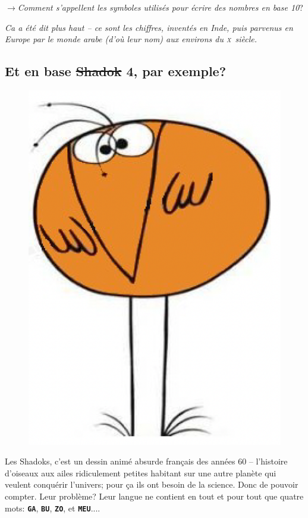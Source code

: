 \documentclass[12pt]{article}
\newcommand{\MaQuestion}[1]{\par\vspace{0.3\baselineskip}\noindent$\rightarrow$\textit{#1}?\par\vspace{0.3\baselineskip}}
\newenvironment{MaReponse}
		{\begin{greyedtextbox}\itshape} %
		{\end{greyedtextbox}}            %
\begin{document}
	 \MaQuestion{Comment s'appellent les symboles utilisés pour écrire des nombres en base 10}
\begin{MaReponse}
	Ca a été dit plus haut -- ce sont les chiffres, inventés en Inde, puis parvenus en Europe par le monde arabe (d'où leur nom) aux environs du \textsc{x}\ieme ~siècle.
\end{MaReponse}
	 
	 \pagebreak
	 \subsection{Et en base \sout{Shadok} 4, par exemple?}
	 
	\begin{figure}
		\includegraphics[scale=0.2]{001_Shadok.png}
	\end{figure}
	 Les Shadoks, c'est un dessin animé absurde français des années 60 -- l'histoire d'oiseaux aux ailes ridiculement petites habitant sur une autre planète qui veulent conquérir l'univers; pour ça ils ont besoin de la science. Donc de pouvoir compter. Leur problème? Leur langue ne contient en tout et pour tout que quatre mots: \textbf{\texttt{GA}}, \textbf{\texttt{BU}}, \textbf{\texttt{ZO}}, et \textbf{\texttt{MEU}}....
	
\end{document}
